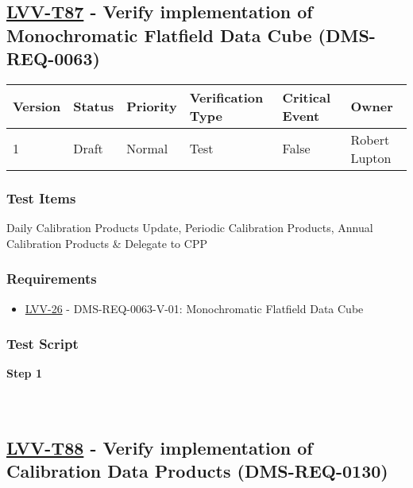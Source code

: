 \hypertarget{lvv-t87---verify-implementation-of-monochromatic-flatfield-data-cube-dms-req-0063}{%
\subsection{\texorpdfstring{\href{https://jira.lsstcorp.org/secure/Tests.jspa\#/testCase/LVV-T87}{LVV-T87}
- Verify implementation of Monochromatic Flatfield Data Cube
(DMS-REQ-0063)}{LVV-T87 - Verify implementation of Monochromatic Flatfield Data Cube (DMS-REQ-0063)}}\label{lvv-t87---verify-implementation-of-monochromatic-flatfield-data-cube-dms-req-0063}}

\begin{longtable}[]{@{}llllll@{}}
\toprule
Version & Status & Priority & Verification Type & Critical Event &
Owner\tabularnewline
\midrule
\endhead
1 & Draft & Normal & Test & False & Robert Lupton\tabularnewline
\bottomrule
\end{longtable}

\hypertarget{test-items-176}{%
\subsubsection{Test Items}\label{test-items-176}}

Daily Calibration Products Update, Periodic Calibration Products, Annual
Calibration Products \& Delegate to CPP

\hypertarget{requirements-177}{%
\subsubsection{Requirements}\label{requirements-177}}

\begin{itemize}
\tightlist
\item
  \href{https://jira.lsstcorp.org/browse/LVV-26}{LVV-26} -
  DMS-REQ-0063-V-01: Monochromatic Flatfield Data Cube
\end{itemize}

\hypertarget{test-script-177}{%
\subsubsection{Test Script}\label{test-script-177}}

\textbf{Step 1}\\
~\\
~\\

\hypertarget{lvv-t88---verify-implementation-of-calibration-data-products-dms-req-0130}{%
\subsection{\texorpdfstring{\href{https://jira.lsstcorp.org/secure/Tests.jspa\#/testCase/LVV-T88}{LVV-T88}
- Verify implementation of Calibration Data Products
(DMS-REQ-0130)}{LVV-T88 - Verify implementation of Calibration Data Products (DMS-REQ-0130)}}\label{lvv-t88---verify-implementation-of-calibration-data-products-dms-req-0130}}

